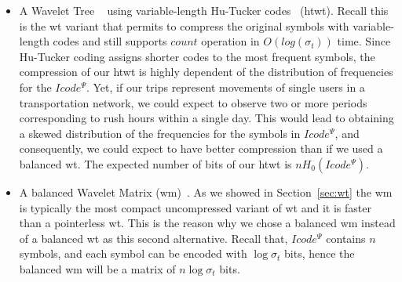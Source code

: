 	\begin{itemize}
	  \item A Wavelet Tree ~\cite{WT03} using variable-length Hu-Tucker codes~\cite{hu1971optimal} (\gls{htwt}).
	  Recall this is the \gls{wt} variant that permits to compress the original symbols with variable-length codes and 
	  still supports $count$ operation in $O(log(\sigma_t))$ time. Since Hu-Tucker coding assigns shorter codes
	  to the most frequent symbols, the compression of our \gls{htwt} is highly dependent of the distribution
	  of frequencies for the $Icode^{\Psi}$. Yet, if our 
	  trips represent movements of single users in a transportation network, we could expect to observe two or more periods 
	  corresponding to rush hours within a single day. This would lead to obtaining a skewed distribution of the frequencies 
	  for the symbols in $Icode^{\Psi}$, and consequently, we could expect to have better compression than if we used a 
	  balanced \gls{wt}. The expected number of bits of our \gls{htwt} is $nH_0(Icode^{\Psi})$.

	  \item A balanced Wavelet Matrix (\gls{wm})~\cite{CNO15}. As we showed in Section~\ref{sec:wt} the \gls{wm} is typically the most
	  compact uncompressed variant of \gls{wt} and it is faster than a pointerless \gls{wt}. This is the reason why we chose
	  a balanced \gls{wm} instead of a balanced \gls{wt} as this second alternative. Recall that, $Icode^{\Psi}$ contains $n$ symbols, 
	  and each symbol can be encoded with $\log  \sigma_t$ bits, hence the 
	  balanced \gls{wm} will be a matrix of $n  \log\sigma_t$ bits.
	  
	\end{itemize}

